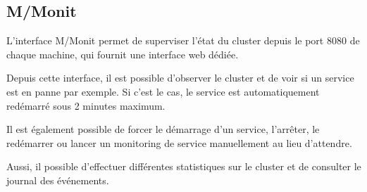 \documentclass[a4paper, 11pt, titlepage]{article}
\begin{document}
\subsection{M/Monit}

L'interface M/Monit permet de superviser l'état du cluster depuis le port 8080 de chaque machine, qui fournit une interface web dédiée.

Depuis cette interface, il est possible d'observer le cluster et de voir si un service est en panne par exemple.
Si c'est le cas, le service est automatiquement redémarré sous 2 minutes maximum.

Il est également possible de forcer le démarrage d'un service, l'arrêter, le redémarrer ou lancer un monitoring de service manuellement au lieu d'attendre.

Aussi, il possible d'effectuer différentes statistiques sur le cluster et de consulter le journal des événements.
\end{document}
